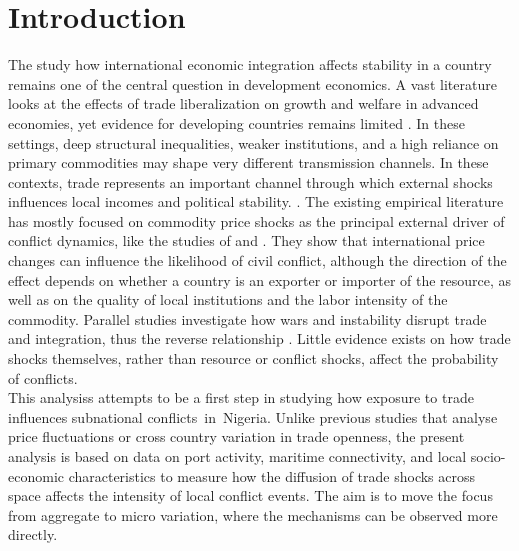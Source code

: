 \chapter{Introduction}
The study how international economic integration affects stability in a country remains one of the central question in development economics. A vast literature looks at the effects of trade liberalization on growth and welfare in advanced economies, yet evidence for developing countries remains limited \parencite{dixcarneiro2023globalization,goldberg2007distributional} . In these settings, deep structural inequalities, weaker institutions, and a high reliance on primary commodities may shape very different transmission channels. In these contexts, trade represents an important channel through which external shocks influences local incomes and political stability. \parencite{united2011review}.
The existing empirical literature has mostly focused on commodity price shocks as the principal external driver of conflict dynamics, like the studies of \textcite{dube2013commodity} and \textcite{bruckner2010international}. They show that international price changes can influence the likelihood of civil conflict, although the direction of the effect depends on whether a country is an exporter or importer of the resource, as well as on the quality of local institutions and the labor intensity of the commodity. Parallel studies investigate how wars and instability disrupt trade and integration, thus the reverse relationship \parencite{rauschendorfer2022trade}. Little evidence exists on how trade shocks themselves, rather than resource or conflict shocks, affect the probability of conflicts. \\
This analysiss attempts to be a first step in studying how exposure to trade influences
subnational conflicts in Nigeria. Unlike previous studies that analyse price fluctuations or cross country variation in trade openness, the present analysis is based on data on port activity, maritime connectivity, and local socio-economic characteristics to measure how the diffusion of trade shocks across space affects the intensity of local conflict events. The aim is to move the focus from aggregate to micro variation, where the mechanisms can be observed more directly.\\

